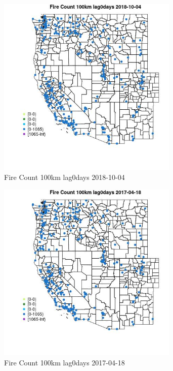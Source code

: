 \begin{figure} 
\centering  
\includegraphics[width=0.77\textwidth]{Code_Outputs/Report_ML_input_PM25_Step4_part_f_de_duplicated_aves_prioritize_24hr_obswNAs_MapObsFire_Count_100km_lag0days2018-10-04.jpg} 
\caption{\label{fig:Report_ML_input_PM25_Step4_part_f_de_duplicated_aves_prioritize_24hr_obswNAsMapObsFire_Count_100km_lag0days2018-10-04}Fire Count 100km lag0days 2018-10-04} 
\end{figure} 
 

\begin{figure} 
\centering  
\includegraphics[width=0.77\textwidth]{Code_Outputs/Report_ML_input_PM25_Step4_part_f_de_duplicated_aves_prioritize_24hr_obswNAs_MapObsFire_Count_100km_lag0days2017-04-18.jpg} 
\caption{\label{fig:Report_ML_input_PM25_Step4_part_f_de_duplicated_aves_prioritize_24hr_obswNAsMapObsFire_Count_100km_lag0days2017-04-18}Fire Count 100km lag0days 2017-04-18} 
\end{figure} 
 

